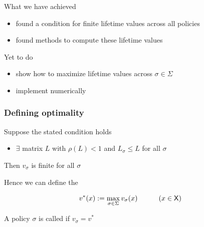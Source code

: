 \documentclass[xcolor=tex,dvipsnames]{beamer}
\begin{document}
\begin{frame}
    
    What we have achieved

    \begin{itemize}
        \item found a condition for finite lifetime values across all policies
        \vspace{0.4em}
        \item found methods to compute these lifetime values
    \end{itemize}


        \vspace{0.4em}
        \vspace{0.4em}
        \vspace{0.4em}
        \vspace{0.4em}
    Yet to do

    \begin{itemize}
        \item show how to maximize lifetime values across $\sigma \in \Sigma$
        \vspace{0.4em}
        \item implement numerically
    \end{itemize}

\end{frame}


\begin{frame}
    \frametitle{Defining optimality}
    
    Suppose the stated condition holds
    \begin{itemize}
        \item $\exists$ matrix $L$ with $\rho(L) < 1$ and $L_\sigma \leq L$ for
            all $\sigma$
    \end{itemize}

    \vspace{0.4em}
    \vspace{0.4em}
    Then $v_\sigma$ is finite for all $\sigma$

    \vspace{0.4em}
    \vspace{0.4em}
    Hence we can define the  
    
    \begin{equation*}
        v^*(x) := \max_{\sigma \in \Sigma} v_\sigma(x)
        \quad \qquad (x \in \mathsf X)
    \end{equation*}

    \vspace{0.4em}
    \vspace{0.4em}
    \vspace{0.4em}
    \vspace{0.4em}
    A policy $\sigma$ is called  if $v_\sigma = v^*$


\end{frame}
\end{document}
